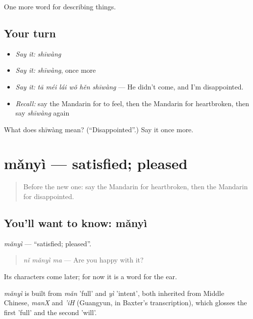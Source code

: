 \begin{grammarlens}[title={What you've built}]
One more word for describing things.
\end{grammarlens}

\subsection*{Your turn}
\begin{itemize}
\raggedright
  \item \emph{Say it:} \emph{shīwàng}
  \item \emph{Say it:} \emph{shīwàng}, once more
  \item \emph{Say it:} \emph{tā méi lái wǒ hěn shīwàng} — He didn't come, and I'm disappointed.
  \item \emph{Recall:} say the Mandarin for to feel, then the Mandarin for heartbroken, then say \emph{shīwàng} again
\end{itemize}

\begin{tcolorbox}[breakable,colback=teal!4,colframe=teal!35!black,title={Before you move on}]
What does shīwàng mean? (\textquotedblleft{}Disappointed\textquotedblright{}.) Say it once more.
\end{tcolorbox}
\section[mǎnyì]{mǎnyì — satisfied; pleased}

\label{lesson:ZH-C252-manyi}



\begin{quote}
Before the new one: say the Mandarin for heartbroken, then the Mandarin for disappointed.
\end{quote}

\subsection*{You'll want to know: mǎnyì}
\emph{mǎnyì} — \textquotedblleft{}satisfied; pleased\textquotedblright{}.

\begin{quote}
\emph{nǐ mǎnyì ma} — Are you happy with it?
\end{quote}

Its characters come later; for now it is a word for the ear.

\begin{cousinweb}
\emph{mǎnyì} is built from \emph{mǎn} 'full' and \emph{yì} 'intent', both inherited from Middle Chinese, \emph{manX} and \emph{'iH} (Guangyun, in Baxter's transcription), which glosses the first 'full' and the second 'will'.
\end{cousinweb}

